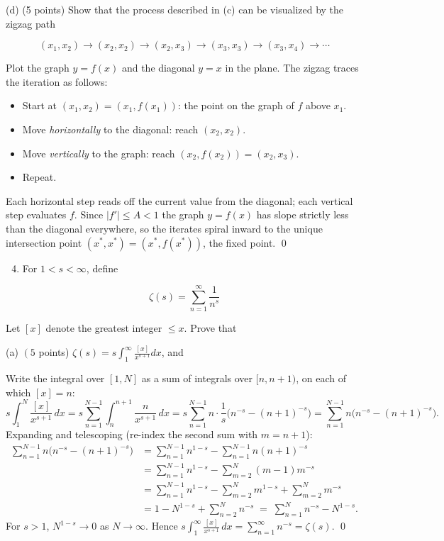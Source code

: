 \documentclass[10pt]{article}
\newenvironment{solution}{%
  \par\medskip\noindent{\color{red}\textbf{Solution.}}\color{red}\;}%
  {\par\medskip}
\begin{document}
(d) (5 points) Show that the process described in (c) can be visualized by the zigzag path

$$
\left(x_{1}, x_{2}\right) \rightarrow\left(x_{2}, x_{2}\right) \rightarrow\left(x_{2}, x_{3}\right) \rightarrow\left(x_{3}, x_{3}\right) \rightarrow\left(x_{3}, x_{4}\right) \rightarrow \cdots
$$

\begin{solution}
Plot the graph $y = f(x)$ and the diagonal $y = x$ in the plane. The zigzag traces the iteration as follows:
\begin{itemize}
  \item Start at $(x_1, x_2) = (x_1, f(x_1))$: the point on the graph of $f$ above $x_1$.
  \item Move \emph{horizontally} to the diagonal: reach $(x_2, x_2)$.
  \item Move \emph{vertically} to the graph: reach $(x_2, f(x_2)) = (x_2, x_3)$.
  \item Repeat.
\end{itemize}
Each horizontal step reads off the current value from the diagonal; each vertical step evaluates $f$. Since $|f'| \leq A < 1$ the graph $y = f(x)$ has slope strictly less than the diagonal everywhere, so the iterates spiral inward to the unique intersection point $(x^*, x^*) = (x^*, f(x^*))$, the fixed point. \qed
\end{solution}
\clearpage
\begin{enumerate}
  \setcounter{enumi}{3}
  \item For $1<s<\infty$, define
\end{enumerate}

$$
\zeta(s)=\sum_{n=1}^{\infty} \frac{1}{n^{s}}
$$

Let $[x]$ denote the greatest integer $\leq x$. Prove that

(a) $\left(5\right.$ points) $\zeta(s)=s \int_{1}^{\infty} \frac{[x]}{x^{s+1}} d x$, and

\begin{solution}
Write the integral over $[1,N]$ as a sum of integrals over $[n, n+1)$, on each of which $[x] = n$:
$$
s\int_1^N \frac{[x]}{x^{s+1}}\,dx = s\sum_{n=1}^{N-1}\int_n^{n+1}\frac{n}{x^{s+1}}\,dx = s\sum_{n=1}^{N-1} n\cdot \frac{1}{s}\bigl(n^{-s} - (n+1)^{-s}\bigr) = \sum_{n=1}^{N-1}n\bigl(n^{-s}-(n+1)^{-s}\bigr).
$$
Expanding and telescoping (re-index the second sum with $m = n+1$):
\begin{align*}
\sum_{n=1}^{N-1}n\bigl(n^{-s}-(n+1)^{-s}\bigr)
&= \sum_{n=1}^{N-1}n^{1-s} - \sum_{n=1}^{N-1}n(n+1)^{-s} \\
&= \sum_{n=1}^{N-1}n^{1-s} - \sum_{m=2}^{N}(m-1)m^{-s} \\
&= \sum_{n=1}^{N-1}n^{1-s} - \sum_{m=2}^{N}m^{1-s} + \sum_{m=2}^{N}m^{-s} \\
&= 1 - N^{1-s} + \sum_{n=2}^{N}n^{-s} \;=\; \sum_{n=1}^{N}n^{-s} - N^{1-s}.
\end{align*}
For $s > 1$, $N^{1-s} \to 0$ as $N\to\infty$. Hence $s\int_1^\infty \frac{[x]}{x^{s+1}}\,dx = \sum_{n=1}^\infty n^{-s} = \zeta(s)$. \qed
\end{solution}
\end{document}
